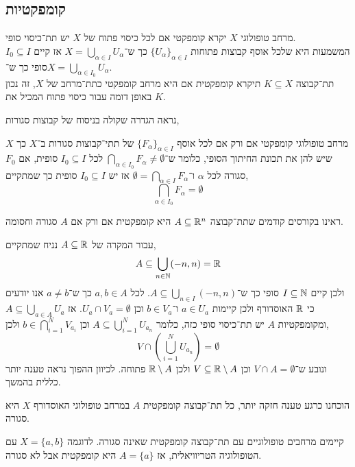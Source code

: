 \subsection{קומפקטיות}
\begin{definition}[קומפקטיות]
	מרחב טופולוגי $X$ יקרא קומפקטי אם לכל כיסוי פתוח של $X$ יש תת־כיסוי סופי. \\
	המשמעות היא שלכל אוסף קבוצות פתוחות ${\{ U_{\alpha} \}}_{\alpha \in I}$ כך ש־$X = \bigcup_{\alpha \in I} U_{\alpha}$ אז קיים $I_{0} \subseteq I$ סופי כך ש־$X = \bigcup_{\alpha \in I_{0}} U_{\alpha}$. \\
	תת־קבוצה $K \subseteq X$ תיקרא קומפקטית אם היא מרחב קומפקטי כתת־מרחב של $X$, זה נכון באופן דומה עבור כיסוי פתוח המכיל את $K$.
\end{definition}
נראה הגדרה שקולה בניסוח של קבוצות סגורות,
\begin{definition}
	$X$ מרחב טופולוגי קומפקטי אם ורק אם לכל אוסף ${\{ F_{\alpha} \}}_{\alpha \in I}$ של תתי־קבוצות סגורות ב־$X$ כך שיש להן את תכונת החיתוך הסופי,
	כלומר ש־$\bigcap_{\alpha \in I_{0}} F_{\alpha} \ne \emptyset$ לכל $I_{0} \subseteq I$ סופית,
	אם $F_{0}$ סגורה לכל $\alpha$ ו־$\emptyset = \bigcap_{\alpha \in I} F_{\alpha}$ אז יש $I_{0} \subseteq I$ סופית כך שמתקיים,
	\[
		\bigcap_{\alpha \in I_{0}} F_{\alpha} = \emptyset
	\]
\end{definition}
\begin{remark}
	ראינו בקורסים קודמים שתת־קבוצה $A \subseteq \mathbb{R}^n$ היא קומפקטית אם ורק אם $A$ סגורה וחסומה.

	עבור המקרה של $A \subseteq \mathbb{R}$ נניח שמתקיים,
	\[
		A \subseteq \bigcup_{n \in \mathbb{N}} (-n, n) = \mathbb{R}
	\]
	ולכן קיים $I \subseteq \mathbb{N}$ סופי כך ש־$A \subseteq \bigcup_{n \in I} (-n, n)$.
	לכל $a, b \in A$ כך ש־$a \ne b$ אנו יודעים כי $\mathbb{R}$ האוסדורף ולכן קיימות $a \in U_a$ ו־$b \in V_a$ וכן $U_a \cap V_a = \emptyset$.
	אז $A \subseteq \bigcup_{a \in A} U_a$ ומקומפקטיות $A$ יש תת־כיסוי סופי כזה, כלומר $A \subseteq \bigcup_{i = 1}^N U_{a_n}$ וכן $b \in \bigcap_{i = 1}^N V_{a_i}$ ולכן,
	\[
		V \cap (\bigcup_{i = 1}^N U_{a_n}) = \emptyset
	\]
	ונובע ש־$V \cap A = \emptyset$ וכן $V \subseteq \mathbb{R} \setminus A$ ולכן $\mathbb{R} \setminus A$ פתוחה.
	לכיוון ההפוך נראה טענה יותר כללית בהמשך.

	הוכחנו כרגע טענה חזקה יותר, כל תת־קבוצה קומפקטית $A$ במרחב טופולוגי האוסדורף $X$ היא סגורה.
\end{remark}
\begin{remark}
	קיימים מרחבים טופולוגיים עם תת־קבוצה קומפקטית שאינה סגורה.
	לדוגמה $X = \{ a, b \}$ עם הטופולוגיה הטריוויאלית,
	אז $A = \{ a \}$ היא קומפקטית אבל לא סגורה.
\end{remark}

